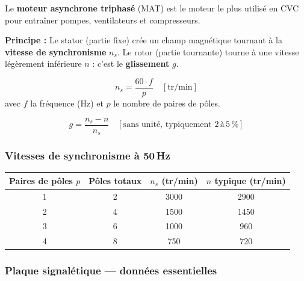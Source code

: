 Le \textbf{moteur asynchrone triphasé} (MAT) est le moteur le plus utilisé en CVC pour entraîner pompes, ventilateurs et compresseurs.

\begin{definition}
  \textbf{Principe :} Le stator (partie fixe) crée un champ magnétique tournant à la \textbf{vitesse de synchronisme} $n_s$. Le rotor (partie tournante) tourne à une vitesse légèrement inférieure $n$ : c'est le \textbf{glissement} $g$.

  \begin{equation}
    n_s = \frac{60 \cdot f}{p} \quad [\text{tr/min}]
  \end{equation}
  avec $f$ la fréquence (Hz) et $p$ le nombre de paires de pôles.

  \begin{equation}
    g = \frac{n_s - n}{n_s} \quad [\text{sans unité, typiquement } 2\,\text{à}\,5\,\%]
  \end{equation}
\end{definition}

\subsubsection{Vitesses de synchronisme à 50\,Hz}

\begin{center}
  \begin{tabular}{cccc}
    \toprule
    Paires de pôles $p$ & Pôles totaux & $n_s$ (tr/min) & $n$ typique (tr/min) \\
    \midrule
    1 & 2 & 3000 & 2900 \\
    2 & 4 & 1500 & 1450 \\
    3 & 6 & 1000 & 960 \\
    4 & 8 & 750  & 720 \\
    \bottomrule
  \end{tabular}
\end{center}

\subsubsection{Plaque signalétique — données essentielles}

